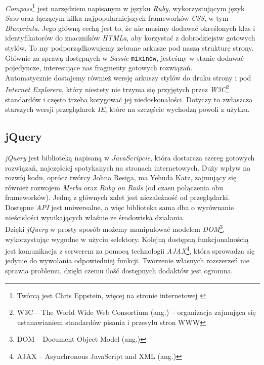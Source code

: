 \documentclass[a4paper,12pt]{article}
\begin{document}
\emph{Compass}\footnote{Twórcą jest Chris Eppstein, więcej na stronie internetowej
\cite{compass}} jest narzędziem napisanym w języku \emph{Ruby}, wykorzystującym język
\emph{Sass} oraz łączącym kilka najpopularniejszych frameworków \emph{CSS}, w tym
\emph{Blueprinta}. Jego główną cechą jest to, że nie musimy dodawać określonych klas i
identyfikatorów do znaczników \emph{HTMLa}, aby korzystać z dobrodziejstw gotowych stylów.
To my podporządkowujemy zebrane arkusze pod naszą strukturę strony. Głównie za sprawą
dostępnych w \emph{Sassie} \texttt{mixinów}, jesteśmy w stanie dodawać pojedyncze,
interesujące nas fragmenty gotowych rozwiązań.\\
Automatycznie dostajemy również wersję arkuszy stylów do druku strony i pod \emph{Internet
Explorera}, który niestety nie trzyma się przyjętych przez \emph{W3C}\footnote{W3C -- The
World Wide Web Consortium (ang.) -- organizacja zajmująca się ustanawianiem standardów pisania i
przesyłu stron WWW} standardów i często trzeba korygować jej niedoskonałości. Dotyczy to
zwłaszcza starszych wersji przeglądarek \emph{IE}, które na szczęście wychodzą powoli z
użytku.


\subsection{jQuery}
\emph{jQuery} jest biblioteką napisaną w \emph{JavaScripcie}, która dostarcza szereg
gotowych rozwiązań, najczęściej spotykanych na stronach internetowych. Duży wpływ na
rozwój kodu, oprócz twórcy Johna Resiga, ma Yehuda Katz, zajmujący się również rozwojem
\emph{Merba} oraz \emph{Ruby on Rails} (od czasu połączenia obu frameworków).
Jedną z głównych zalet jest niezależność od przeglądarki. Dostępne \emph{API} jest
uniwersalne, a więc biblioteka sama dba o wyrównanie nieścisłości wynikających właśnie ze
środowiska działania.\\
Dzięki \emph{jQuery} w prosty sposób możemy manipulować modelem \emph{DOM}\footnote{DOM --
Document Object Model (ang.)}, wykorzystując wygodne w użyciu selektory. Kolejną dostępną
funkcjonalnością jest komunikacja z serwerem za pomocą technologii
\emph{AJAX}\footnote{AJAX -- Asynchronous JavaScript and XML (ang.)}, która sprowadza się
jedynie do wywołania odpowiedniej funkcji. Tworzenie własnych rozszerzeń nie sprawia
problemu, dzięki czemu ilość dostępnych dodaktów jest ogromna.
\end{document}
